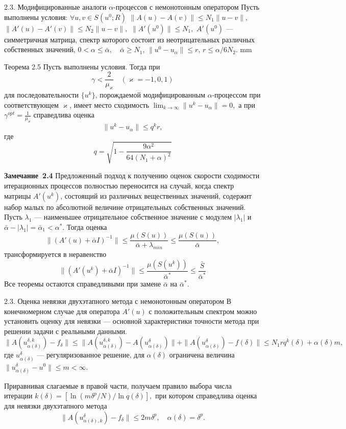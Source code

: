 \documentclass[10pt,pdf, mathserif, hyperref={unicode}]{beamer}
\begin{document}
\begin{frame}{\small 2.3. Модифицированные аналоги $\alpha$-процессов с немонотонным оператором}
	Пусть выполнены условия:
	$\forall u, v \in S(u^0;R)$ $\|A(u)-A(v)\|\leqslant N_1\|u-v\|$, $\|A'(u)-A'(v)\|\leqslant N_2\|u-v\|,$
	$\|A'(u^0)\| \leqslant N_1,$
	$A'(u^0)$ --- симметричная матрица, спектр которого состоит из неотрицательных различных собственных значений,
	$0<\alpha\leqslant\bar{\alpha},\quad \bar{\alpha}\geqslant N_1$, $\|u^0-u_\alpha\| \leqslant r$, $r\leqslant\alpha/6N_2$.
	 mm	
	\begin{block}{Теорема 2.5}
		Пусть выполнены условия. Тогда при
		$$\gamma <\frac{2}{\mu _\varkappa}\quad (\varkappa=-1,0,1)$$
		для последовательности $\{u^k\}$, порождаемой модифицированным $\alpha$-процессом при соответствующем $\varkappa$, имеет место сходимость $\lim_{k\to\infty}\|u^k-u_\alpha\|=0, $ а при 
		$\gamma^{opt}=\frac{1}{\mu_\varkappa}$
		справедлива оценка $$\|u^k-u_\alpha\|\leqslant q^k r,$$ где
		$$q=\sqrt{1-\frac{9\alpha^2}{64(N_1+\alpha)^2}}$$
	\end{block}
\end{frame}

\begin{frame}
	\begin{block}{\bf Замечание~2.4} Предложенный подход к получению оценок скорости сходимости итерационных процессов полностью переносится на случай, когда спектр матрицы $A'(u^k)$, состоящий из различных вещественных значений, содержит набор малых по абсолютной величине отрицательных собственных значений. Пусть $\lambda _1$ --- наименьшее отрицательное собственное значение с  модулем $|\lambda_1|$ и $\bar\alpha -|\lambda _1|=\bar\alpha _1<\alpha^*$. Тогда оценка 
		$$\|(A'(u)+\bar\alpha I)^{-1}\|\leqslant \frac{\mu (S(u))}{\bar\alpha+\lambda_{min}} \leqslant \frac{\mu(S(u))}{\bar\alpha},$$ 
		трансформируется в неравенство
		$$\|(A'(u^k)+\bar\alpha I)^{-1}\|\leqslant\frac{\mu(S(u^k))}{\bar\alpha^*}\leqslant\frac{\bar S}{\bar\alpha^*}$$
		Все теоремы остаются справедливыми при замене $\bar\alpha$ на $\bar\alpha^*$.
	\end{block}
\end{frame}

\begin{frame}{2.3. Оценка невязки двухэтапного метода с немонотонным оператором}
	В конечномерном случае для оператора $A'(u)$ с положительным спектром можно установить оценку для невязки --- основной характеристики точности метода при решении задачи с реальными данными.
	$$\|A(u_{\alpha(\delta)}^{\delta, k})-f_\delta\|\le\|A(u_{\alpha(\delta)}^{\delta, k})-A(u_{\alpha(\delta)}^{\delta})\|+\|A(u_{\alpha(\delta)}^{\delta})-f(\delta)\|\le N_1 r q^k(\delta)+\alpha(\delta)m,$$
	где $u_{\alpha(\delta)}^{\delta}$ --- регуляризованное решение, для $\alpha(\delta)$ ограничена величина $\|u_{\alpha(\delta)}^{\delta}-u^0\|\leqslant m <\infty$.
	
	Приравнивая слагаемые в правой части, получаем правило выбора числа итерации
	$k(\delta)=\left [\ln(m\delta^p/N)/\ln q(\delta)\right ],$ при котором справедлива оценка для невязки двухэтапного метода
	$$\|A(u_{\alpha(\delta),k}^{\delta})-f_\delta\|\leqslant 2m\delta^p, \quad \alpha(\delta)=\delta^p.$$ 
\end{frame}
\end{document}
